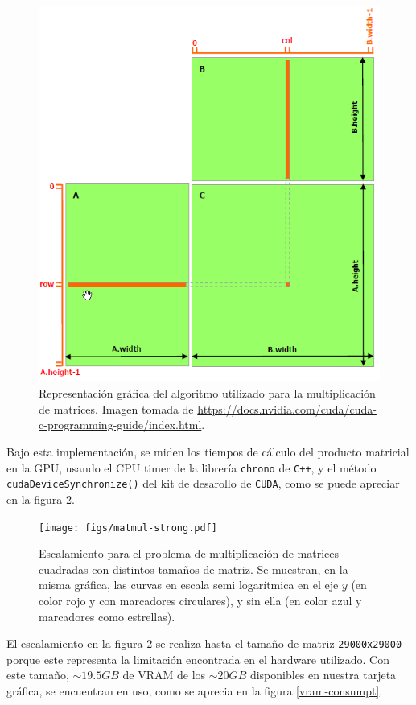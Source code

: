 \documentclass[journal, onecolumn, a4paper, 11pt]{IEEEtran}
\begin{document}
\begin{figure}[!h]
    \centering
    \includegraphics[width=0.5\linewidth]{figs/aux/matrix-multiplication-without-shared-memory.png}
    \caption{Representación gráfica del algoritmo utilizado para la multiplicación de matrices. Imagen tomada de \url{https://docs.nvidia.com/cuda/cuda-c-programming-guide/index.html}.}
    \label{fig:enter-label}
\end{figure}

Bajo esta implementación, se miden los tiempos de cálculo del producto matricial en la GPU, usando el CPU timer de la librería \texttt{chrono} de \texttt{C++}, y el método \texttt{cudaDeviceSynchronize()} del kit de desarollo de \texttt{CUDA}, como se puede apreciar en la figura \ref{strong-matmul}.

\begin{figure}[h!]
    \centering
        \texttt{[image: figs/matmul-strong.pdf]}
    \caption{Escalamiento para el problema de multiplicación de matrices cuadradas con distintos tamaños de matriz. Se muestran, en la misma gráfica, las curvas en escala semi logarítmica en el eje $y$ (en color rojo y con marcadores circulares), y sin ella (en color azul y marcadores como estrellas).}
    \label{strong-matmul}
\end{figure}

\newpage

El escalamiento en la figura \ref{strong-matmul} se realiza hasta el tamaño de matriz \texttt{29000x29000} porque este representa la limitación encontrada en el hardware utilizado. Con este tamaño, $\sim19.5GB$ de VRAM de los $\sim20GB$ disponibles en nuestra tarjeta gráfica, se encuentran en uso, como se aprecia en la figura \ref{vram-consumpt}.

\newpage
\end{document}
